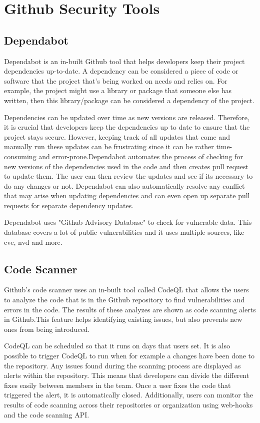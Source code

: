 \section{Github Security Tools}

\subsection{Dependabot}
Dependabot is an in-built Github tool that helps developers keep their project dependencies up-to-date. A dependency can be considered a piece of code or software that the project that's being worked on needs and relies on. For example, the project might use a library or package that someone else has written, then this library/package can be considered a dependency of the project. 

Dependencies can be updated over time as new versions are released. Therefore, it is crucial that developers keep the dependencies up to date to ensure that the project stays secure. However, keeping track of all updates that come and manually run these updates can be frustrating since it can be rather time-consuming and error-prone.Dependabot automates the process of checking for new versions of the dependencies used in the code and then creates pull request to update them. The user can then review the updates and see if its necessary to do any changes or not. 
Dependabot can also automatically resolve any conflict that may arise when updating dependencies and can even open up separate pull requests for separate dependency updates.  \cite{GithubDependabot2}

Dependabot uses "Github Advisory Database" to check for vulnerable data. This database covers a lot of public vulnerabilities and it uses multiple sources, like \acrlong{cve}, \acrlong{nvd} and more. \cite{GithubDependabot1}

\subsection{Code Scanner}
Github's code scanner uses an in-built tool called CodeQL that allows the users to analyze the code that is in the Github repository to find vulnerabilities and errors in the code. The results of these analyzes are shown as code scanning alerts in Github.This feature helps identifying existing issues, but also prevents new ones from being introduced. \cite{CodeQL1}

CodeQL can be scheduled so that it runs on days that users set. It is also possible to trigger CodeQL to run when for example a changes have been done to the repository.
 Any issues found during the scanning process are displayed as alerts within the repository. This means that developers can divide the different fixes easily between members in the team.  Once a user fixes the code that triggered the alert, it is automatically closed. Additionally, users can monitor the results of code scanning across their repositories or organization using web-hooks and the code scanning API. 
\cite{GithubCodeScanning}




